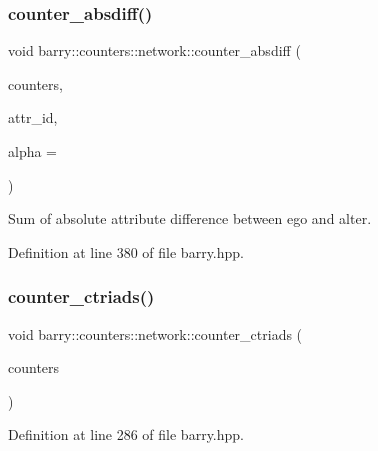 \subsubsection{\texorpdfstring{counter\+\_\+absdiff()}{counter\_absdiff()}}
{\footnotesize\ttfamily void barry\+::counters\+::network\+::counter\+\_\+absdiff (\begin{DoxyParamCaption}\item[{\hyperlink{namespacebarry_1_1counters_1_1network_a3b3c590303d47840d1967372ae495d95}{Net\+Counter\+Vector} $\ast$}]{counters,  }\item[{\hyperlink{namespacebarry_a11dfc53ddb4672278319aa04f1e09a6c}{uint}}]{attr\+\_\+id,  }\item[{double}]{alpha = {} }\end{DoxyParamCaption})\hspace{0.3cm}{\ttfamily [inline]}}



Sum of absolute attribute difference between ego and alter. 



Definition at line 380 of file barry.\+hpp.

\mbox{\label{namespacebarry_1_1counters_1_1network_a5262c1e8a14c9956041adead348a4890}} 
\subsubsection{\texorpdfstring{counter\+\_\+ctriads()}{counter\_ctriads()}}
{\footnotesize\ttfamily void barry\+::counters\+::network\+::counter\+\_\+ctriads (\begin{DoxyParamCaption}\item[{\hyperlink{namespacebarry_1_1counters_1_1network_a3b3c590303d47840d1967372ae495d95}{Net\+Counter\+Vector} $\ast$}]{counters }\end{DoxyParamCaption})\hspace{0.3cm}{\ttfamily [inline]}}



Definition at line 286 of file barry.\+hpp.

\mbox{\label{namespacebarry_1_1counters_1_1network_a8c7ef19041094ac55a17106940c7d244}} 
